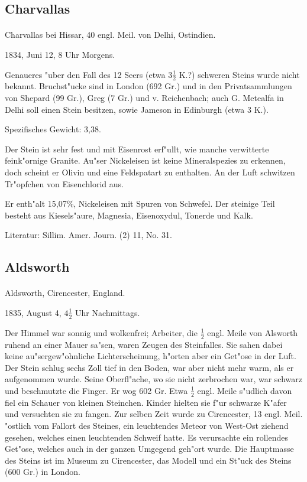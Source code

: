 \documentclass[a4paper, 11pt, oneside]{article}
\begin{document}
\subsection{Charvallas}
\normalsize
\paragraph{}
Charvallas bei Hissar, 40 engl. Meil. von Delhi, Ostindien.

1834, Juni 12, 8 Uhr Morgens.

Genaueres "uber den Fall des 12 Seers (etwa $3\frac{1}{2}$ K.?) schweren Steins wurde nicht bekannt. Bruchst"ucke sind in London (692 Gr.) und in den Privatsammlungen von Shepard (99 Gr.), Greg (7 Gr.) und v. Reichenbach; auch G. Metealfa in Delhi soll einen Stein besitzen, sowie Jameson in Edinburgh (etwa 3 K.).

Spezifisches Gewicht: 3,38.

Der Stein ist sehr fest und mit Eisenrost erf"ullt, wie manche verwitterte feink"ornige Granite. Au"ser Nickeleisen ist keine Mineralspezies zu erkennen, doch scheint er Olivin und eine Feldspatart zu enthalten. An der Luft schwitzen Tr"opfchen von Eisenchlorid aus.

Er enth"alt 15,07\%, Nickeleisen mit Spuren von Schwefel. Der steinige Teil besteht aus Kiesels"aure, Magnesia, Eisenoxydul, Tonerde und Kalk.

\footnotesize
Literatur: Sillim. Amer. Journ. (2) 11, No. 31.

\subsection{Aldsworth}
\normalsize
\paragraph{}
Aldsworth, Cirencester, England.

1835, August 4, $4\frac{1}{2}$ Uhr Nachmittags.

Der Himmel war sonnig und wolkenfrei; Arbeiter, die $\frac{1}{2}$ engl. Meile von Alsworth ruhend an einer Mauer sa"sen, waren Zeugen des Steinfalles. Sie sahen dabei keine au"sergew"ohnliche Lichterscheinung, h"orten aber ein Get"ose in der Luft. Der Stein schlug sechs Zoll tief in den Boden, war aber nicht mehr warm, als er aufgenommen wurde. Seine Oberfl"ache, wo sie nicht zerbrochen war, war schwarz und beschmutzte die Finger. Er wog 602 Gr. Etwa $\frac{1}{2}$ engl. Meile s"udlich davon fiel ein Schauer von kleinen Steinchen. Kinder hielten sie f"ur schwarze K"afer und versuchten sie zu fangen. Zur selben Zeit wurde zu Cirencester, 13 engl. Meil. "ostlich vom Fallort des Steines, ein leuchtendes Meteor von West-Ost ziehend gesehen, welches einen leuchtenden Schweif hatte. Es verursachte ein rollendes Get"ose, welches auch in der ganzen Umgegend geh"ort wurde. Die Hauptmasse des Steins ist im Museum zu Cirencester, das Modell und ein St"uck des Steins (600 Gr.) in London.
\end{document}
